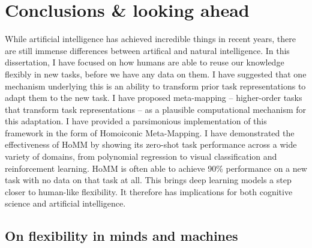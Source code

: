 \chapter{Conclusions \& looking ahead} \label{chapter:conclusions}

While artificial intelligence has achieved incredible things in recent years, there are still immense differences between artifical and natural intelligence. In this dissertation, I have focused on how humans are able to reuse our knowledge flexibly in new tasks, before we have any data on them. I have suggested that one mechanism underlying this is an ability to transform prior task representations to adapt them to the new task. I have proposed meta-mapping -- higher-order tasks that transform task representations -- as a plausible computational mechanism for this adaptation. I have provided a parsimonious implementation of this framework in the form of Homoiconic Meta-Mapping. I have demonstrated the effectiveness of HoMM by showing its zero-shot task performance across a wide variety of domains, from polynomial regression to visual classification and reinforcement learning. HoMM is often able to achieve 90\% performance on a new task with no data on that task at all. This brings deep learning models a step closer to human-like flexibility. It therefore has implications for both cognitive science and artificial intelligence. \par  

\section{On flexibility in minds and machines}

